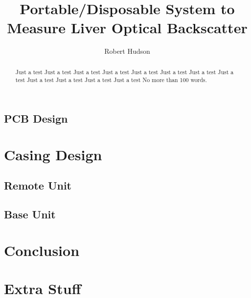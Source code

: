 \documentclass[draft]{IIBproject}
\begin{document}
\author{Robert Hudson}
\title{Portable/Disposable System to Measure Liver Optical Backscatter}
\maketitle
\thispagestyle{empty}


\begin{abstract}
Just a test Just a test Just a test Just a test Just a test Just a test 
Just a test Just a test Just a test Just a test Just a test Just a test 
No more than 100 words.
\end{abstract}

\newpage
\tableofcontents
\newpage
\pagestyle{plain}














\subsection{PCB Design}





\section{Casing Design}

\subsection{Remote Unit}

\subsection{Base Unit}

\section{Conclusion}



\newpage


%

\appendix

\section{Extra Stuff}
\end{document}
